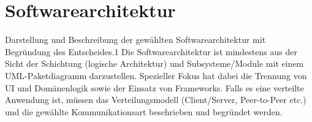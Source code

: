 \section{Softwarearchitektur}
Darstellung und Beschreibung der gewählten Softwarearchitektur mit Begründung des Entscheides.1
Die Softwarearchitektur ist mindestens aus der Sicht der Schichtung (logische Architektur) und 
Subsysteme/Module mit einem UML-Paketdiagramm darzustellen. Spezieller Fokus hat dabei 
die Trennung von UI und Domänenlogik sowie der Einsatz von Frameworks.
Falls es eine verteilte Anwendung ist, müssen das Verteilungsmodell (Client/Server, Peer-to-Peer etc.) und die gewählte Kommunikationsart beschrieben und begründet werden. 